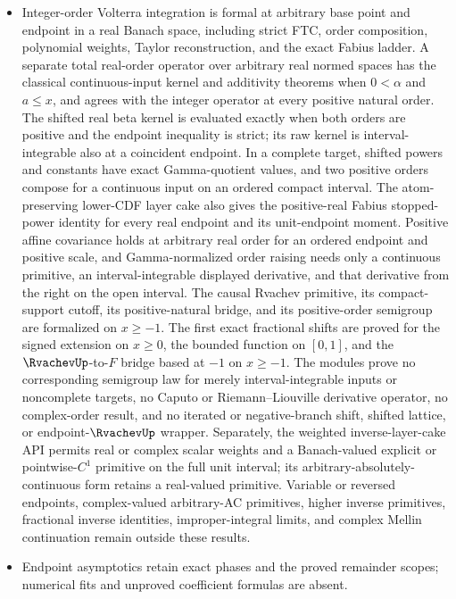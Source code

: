 \documentclass[11pt,oneside]{article}
\theoremstyle{definition}
\theoremstyle{remark}
\begin{document}
\begin{itemize}
      the report's finite-prefix quotient and Bell package, analytic sign/error bounds,
      uniform or derivative convergence, and asymptotic quarter-sinc acceleration remain
      outside the formal corpus.
\item Integer-order Volterra integration is formal at arbitrary base point and endpoint in
      a real Banach space, including strict FTC, order composition, polynomial weights,
      Taylor reconstruction, and the exact Fabius ladder.  A separate total real-order
      operator over arbitrary real normed spaces has the classical continuous-input kernel
      and additivity theorems when \(0<\alpha\) and \(a\le x\), and agrees with the integer
      operator at every positive natural order.  The shifted real beta kernel is evaluated
      exactly when both orders are positive and the endpoint inequality is strict; its raw
      kernel is interval-integrable also at a coincident endpoint.  In a complete target,
      shifted powers and constants have exact Gamma-quotient values, and two positive
      orders compose for a continuous input on an ordered compact interval.  The
      atom-preserving lower-CDF layer cake also gives the positive-real Fabius stopped-power
      identity for every real endpoint and its unit-endpoint moment.
      Positive affine covariance holds at arbitrary real order for an ordered endpoint and
      positive scale, and Gamma-normalized order raising needs only a continuous primitive,
      an interval-integrable displayed derivative, and that derivative from the right on
      the open interval.  The causal Rvachev primitive, its compact-support cutoff, its
      positive-natural bridge, and its positive-order semigroup are formalized on
      \(x\ge-1\).  The first exact fractional shifts are proved for the signed
      extension on \(x\ge0\), the bounded function on \([0,1]\), and the \(\RvachevUp\)-to-\(F\)
      bridge based at \(-1\) on \(x\ge-1\).  The modules prove no corresponding semigroup
      law for merely interval-integrable inputs or noncomplete targets, no Caputo or
      Riemann--Liouville derivative operator, no complex-order result, and no iterated or
      negative-branch shift, shifted lattice, or endpoint-\(\RvachevUp\) wrapper.  Separately, the
      weighted inverse-layer-cake API permits real or complex scalar weights and a
      Banach-valued explicit or pointwise-\(C^1\) primitive on the full unit interval; its
      arbitrary-absolutely-continuous form retains a real-valued primitive.  Variable or
      reversed endpoints, complex-valued arbitrary-AC primitives, higher inverse primitives,
      fractional inverse identities, improper-integral limits, and complex Mellin continuation
      remain outside these results.
\item Endpoint asymptotics retain exact phases and the proved remainder scopes; numerical
      fits and unproved coefficient formulas are absent.
\end{itemize}
\end{document}
